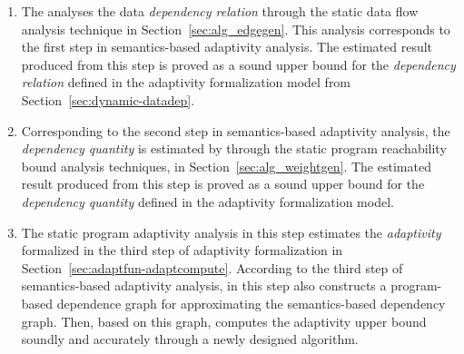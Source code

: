 \begin{enumerate}
\item The {\THESYSTEM} analyses the data \emph{dependency relation} through the static data flow analysis technique in Section~\ref{sec:alg_edgegen}.
This analysis corresponds to the first step in semantics-based adaptivity analysis. 
The estimated result produced from 
this step is proved as a sound upper bound for the \emph{dependency relation} defined in the adaptivity formalization model from Section~\ref{sec:dynamic-datadep}.
\item 
Corresponding to the second step in semantics-based adaptivity analysis, the \emph{dependency quantity} 
is estimated by {\THESYSTEM} through the static program reachability bound analysis techniques, in Section~\ref{sec:alg_weightgen}.
The estimated result produced from 
this step is proved as a sound upper bound for the \emph{dependency quantity} defined in the adaptivity formalization model.
\item 
The static program adaptivity analysis in this step
estimates the \emph{adaptivity} formalized in the third step of adaptivity formalization in Section~\ref{sec:adaptfun-adaptcompute}.
According to the third step of semantics-based adaptivity analysis, 
{\THESYSTEM} in this step also constructs a program-based dependence graph for approximating the semantics-based dependency graph.
Then, based on this graph, {\THESYSTEM} 
computes the adaptivity upper bound soundly 
and accurately through a newly designed algorithm.
\end{enumerate}